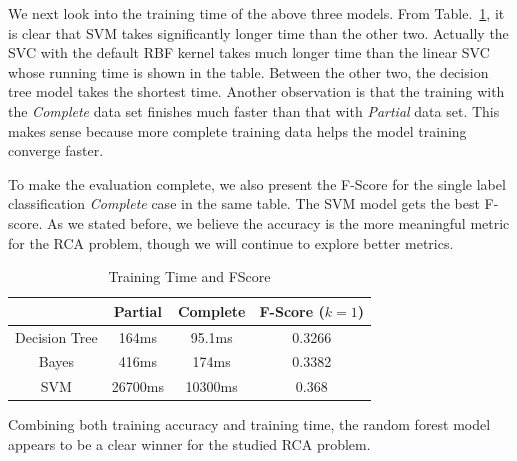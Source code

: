 We next look into the training time of the above three models. From Table.~\ref{tab:time}, it is clear that SVM takes significantly longer time than the other two. Actually the SVC with the default RBF kernel takes much longer time than the linear SVC whose running time is shown in the table. Between the other two, the decision tree model takes the shortest time. Another observation is that the training with the {\it Complete} data set finishes much faster than that with {\it Partial} data set. This makes sense because more complete training data helps the model training converge faster. 

To make the evaluation complete, we also present the F-Score for the single label classification {\it Complete} case in the same table. The SVM model gets the best F-score. As we stated before, we believe the accuracy is the more meaningful metric for the RCA problem, though we will continue to explore better metrics.     
\begin{table}[!ht]
\caption{Training Time and F\-Score
\label{tab:time}}
\vspace{-0.1in}
\begin{center}
\begin{tabular}{ |c|c|c|c| } 
 \hline
  & Partial & Complete & F-Score ($k=1$)\\ 
 \hline\hline
 Decision Tree & 164ms & 95.1ms & 0.3266\\ 
 \hline
 Bayes & 416ms & 174ms & 0.3382 \\
 \hline
 SVM & 26700ms & 10300ms & 0.368 \\ 
 \hline
\end{tabular}
\end{center}
\vspace{-0.1in}
\end{table}
Combining both training accuracy and training time, the random forest model appears to be a clear winner for the studied RCA problem.